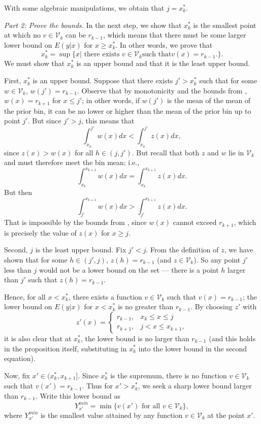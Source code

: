 With some algebraic manipulations, we obtain that $j =
x_k^*$.

\textit{Part 2: Prove the bounds.} 
In the next step, we show that $x_k^*$ is the smallest point at which no
$v \in \mathcal{V}_k$ can be $r_{k-1}$, which means that there must be some
larger lower bound on $E(y | x)$ for $x \geq x_k^*$. In other words, we prove
that $$x_k^* = \sup \Big\{x \vert \text{ there exists } v \in \mathcal{V}_k \text{
such that
} v(x) = r_{k-1}. \Big\}.$$ We must show that $x_k^*$ is an upper bound
and that it is the least upper bound. 

First, $x_k^*$ is an upper bound. Suppose that there exists $j' > x_k^*$ such
that for some $w \in \mathcal{V}_k$, $w(j') = r_{k-1}$. Observe that by
monotonicity and the bounds from \citet{Manski2002}, $w(x) =
r_{k+1}$ for $x \leq j'$; in other words, if $w(j')$ is the mean of
the mean of the prior bin, it can be no lower or higher than the mean
of the prior bin up to point $j'$. But since $j' > j$, this means that 
$$ \int_{x_k}^{j'} w(x)dx < \int_{x_k}^{j'} z(x) dx,$$ since $z(x) >
w(x)$ for all $h \in (j,j')$. But recall that both $z$ and $w$ lie in
$\mathcal{V}_k$ and must therefore meet the bin mean; i.e., 
$$ \int_{x_k}^{x_{k+1}} w(x)dx = \int_{x_k}^{x_{k+1}}
z(x)dx.$$ 
But then $$\int_{j'}^{x_{k+1}} w(x)dx > \int_{j'}^{x_{k+1}} z(x)
dx.$$ That is impossible by the bounds
from \citet{Manski2002}, since $w(x)$ cannot exceed
$r_{k+1}$, which is precisely the value of $z(x)$ for $x \geq j$. 

Second, $j$ is the least upper bound. Fix $j' < j$. From the definition of $z$, we
have shown that for some $h \in (j',j)$, $z(h) = r_{k-1}$ (and $z \in
\mathcal{V}_k$). So any point $j'$ less than $j$ would not be a lower bound on the
set --- there is a point $h$ larger than $j'$ such that $z(h) =
r_{k-1}$. 

Hence, for all $x < x_k^*$, there exists a function $v \in \mathcal{V}_k$ such
that $v(x) = r_{k-1}$; the lower bound on $E(y | x)$ for $x < x_k^*$
is no greater than $r_{k-1}$. By choosing $z'$ with 
$$ 
z'(x) = \begin{cases} 
r_{k-1}, & x_k \leq x \leq j \\
r_{k+1}, & j < x \leq x_{k+1}, 
\end{cases} 
$$ 
it is also clear that at $x_k^*$, the lower bound is no larger 
than $r_{k-1}$ (and this holds in the proposition itself, substituting in
$x_k^*$ into the lower bound in the second equation).

Now, fix $x' \in (x_k^*, x_{k+1}]$. Since $x_k^*$ is the supremum, there
is no function $v \in \mathcal{V}_k$ such that $v(x') = r_{k-1}$. Thus for
$x' > x_k^*$, we seek a sharp lower bound larger than $r_{k-1}$. Write this lower bound as
$$Y_{x'}^{min} = \min \Big\{ v(x') \text{ for all  } v \in \mathcal{V}_k \Big\},$$
where $Y_{x'}^{min}$ is the smallest value attained by any function $v \in \mathcal{V}_k$ at the point
$x'$. 

